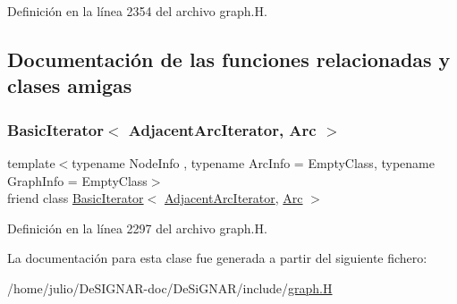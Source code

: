 Definición en la línea 2354 del archivo graph.\+H.



\subsection{Documentación de las funciones relacionadas y clases amigas}
\mbox{\label{class_designar_1_1_digraph_1_1_adjacent_arc_iterator_a73ad70d76f3331ee4b07451db1347918}} 
\subsubsection{\texorpdfstring{Basic\+Iterator$<$ Adjacent\+Arc\+Iterator, Arc $>$}{BasicIterator< AdjacentArcIterator, Arc >}}
{\footnotesize\ttfamily template$<$typename Node\+Info , typename Arc\+Info  = Empty\+Class, typename Graph\+Info  = Empty\+Class$>$ \\
friend class \hyperlink{class_designar_1_1_basic_iterator}{Basic\+Iterator}$<$ \hyperlink{class_designar_1_1_digraph_1_1_adjacent_arc_iterator}{Adjacent\+Arc\+Iterator}, \hyperlink{class_designar_1_1_digraph_a0ceb278671f2a535c00fddccdeafd69f}{Arc} $>$\hspace{0.3cm}{\ttfamily [friend]}}



Definición en la línea 2297 del archivo graph.\+H.



La documentación para esta clase fue generada a partir del siguiente fichero\+:\begin{DoxyCompactItemize}
\item 
/home/julio/\+De\+S\+I\+G\+N\+A\+R-\/doc/\+De\+Si\+G\+N\+A\+R/include/\hyperlink{graph_8_h}{graph.\+H}\end{DoxyCompactItemize}
